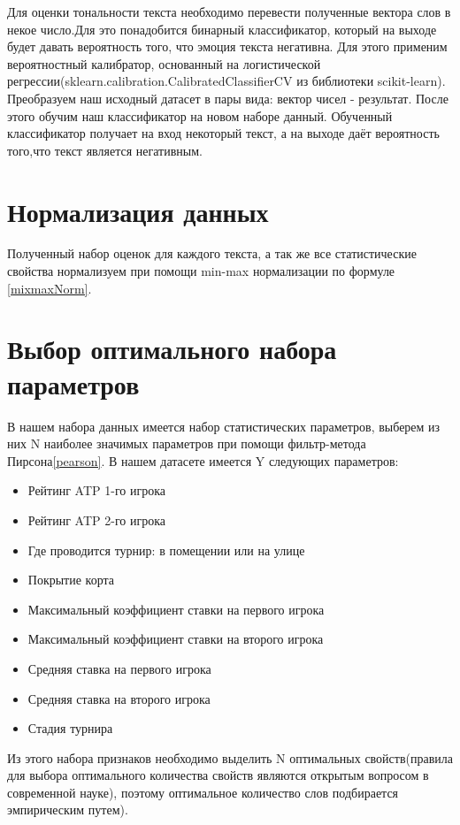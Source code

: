 Для оценки тональности текста необходимо перевести полученные вектора слов в некое число.Для это понадобится бинарный классификатор, который на выходе будет давать вероятность того, что эмоция текста негативна.
Для этого применим вероятностный калибратор, основанный на логистической регрессии(sklearn.calibration.CalibratedClassifierCV из библиотеки scikit-learn).
Преобразуем наш исходный датасет в пары вида: вектор чисел - результат.
После этого обучим наш классификатор на новом наборе данный.
Обученный классификатор получает на вход некоторый текст, а на выходе даёт вероятность того,что текст является негативным.

\section{Нормализация данных}
Полученный набор оценок для каждого текста, а так же все статистические свойства нормализуем при помощи min-max нормализации по формуле \ref{mixmaxNorm}.
\section{Выбор оптимального набора параметров}
В нашем набора данных имеется набор статистических параметров, выберем из них N наиболее значимых параметров при помощи фильтр-метода Пирсона\ref{pearson}.
В нашем датасете имеется Y следующих параметров:
\begin{itemize}
	\item Рейтинг ATP 1-го игрока
	\item Рейтинг ATP 2-го игрока
	\item Где проводится турнир: в помещении или на улице
	\item Покрытие корта
	\item Максимальный коэффициент ставки на первого игрока
	\item Максимальный коэффициент ставки на второго игрока
	\item Средняя ставка на первого игрока
	\item Средняя ставка на второго игрока
	\item Стадия турнира
\end{itemize}

Из этого набора признаков необходимо выделить N оптимальных свойств(правила для выбора оптимального количества свойств являются открытым вопросом в современной науке\cite{Book32}), поэтому оптимальное количество слов подбирается эмпирическим путем).
